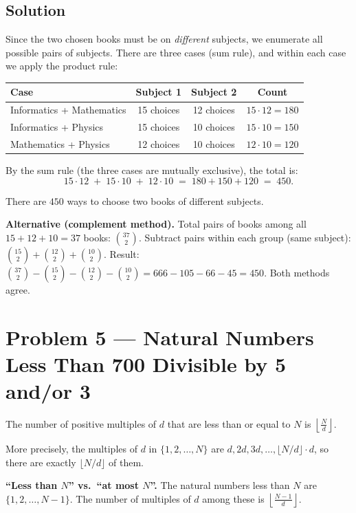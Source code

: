 \documentclass[12pt, a4paper]{article}
\begin{document}
\subsection*{Solution}

Since the two chosen books must be on \emph{different} subjects,
we enumerate all possible pairs of subjects.
There are three cases (sum rule), and within each case we apply
the product rule:

\begin{center}
\renewcommand{\arraystretch}{1.4}
\begin{tabular}{lccc}
\toprule
\textbf{Case} & \textbf{Subject 1} & \textbf{Subject 2} & \textbf{Count} \\
\midrule
Informatics + Mathematics & 15 choices & 12 choices & $15 \cdot 12 = 180$ \\
Informatics + Physics     & 15 choices & 10 choices & $15 \cdot 10 = 150$ \\
Mathematics + Physics     & 12 choices & 10 choices & $12 \cdot 10 = 120$ \\
\bottomrule
\end{tabular}
\end{center}

By the sum rule (the three cases are mutually exclusive), the total is:
\[
  15 \cdot 12 \;+\; 15 \cdot 10 \;+\; 12 \cdot 10
  \;=\; 180 + 150 + 120
  \;=\; 450.
\]

\begin{answerbox}
\centering
There are $\boxed{450}$ ways to choose two books of different subjects.
\end{answerbox}

\textbf{Alternative (complement method).}\;
Total pairs of books among all $15+12+10=37$ books: $\binom{37}{2}$.
Subtract pairs within each group (same subject): $\binom{15}{2} + \binom{12}{2} + \binom{10}{2}$.
Result: $\binom{37}{2} - \binom{15}{2} - \binom{12}{2} - \binom{10}{2} = 666 - 105 - 66 - 45 = 450$.
Both methods agree. \checkmark

\newpage
\section{Problem 5 --- Natural Numbers Less Than 700 Divisible by 5 and/or 3}

\begin{theorybox}
The number of positive multiples of $d$ that are less than or equal to $N$ is
$\left\lfloor \frac{N}{d} \right\rfloor$.

More precisely, the multiples of $d$ in $\{1, 2, \ldots, N\}$ are
$d, 2d, 3d, \ldots, \lfloor N/d \rfloor \cdot d$,
so there are exactly $\lfloor N/d \rfloor$ of them.

\medskip
\textbf{``Less than $N$'' vs.\ ``at most $N$''.}\;
The natural numbers less than $N$ are $\{1, 2, \ldots, N-1\}$.
The number of multiples of $d$ among these is
$\left\lfloor \frac{N-1}{d} \right\rfloor$.
\end{theorybox}
\end{document}
